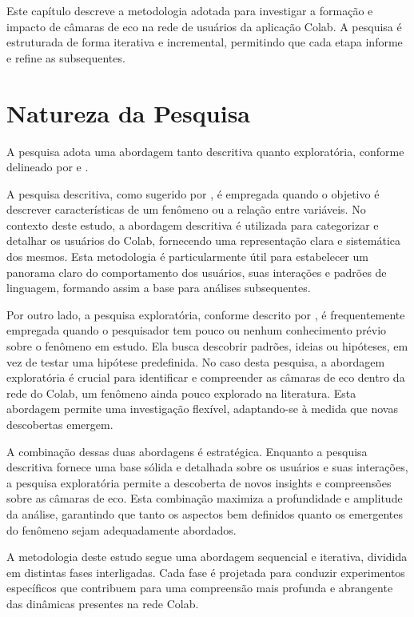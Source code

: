Este capítulo descreve a metodologia adotada para investigar a formação e impacto de câmaras de eco na rede de usuários da aplicação Colab. A pesquisa é estruturada de forma iterativa e incremental, permitindo que cada etapa informe e refine as subsequentes.

\section{Natureza da Pesquisa}

A pesquisa adota uma abordagem tanto descritiva quanto exploratória, conforme delineado por \cite{2008_Yin_BOOK} e \cite{2007_Babbie_BOOK}.

A pesquisa descritiva, como sugerido por \cite{2007_Babbie_BOOK}, é empregada quando o objetivo é descrever características de um fenômeno ou a relação entre variáveis. No contexto deste estudo, a abordagem descritiva é utilizada para categorizar e detalhar os usuários do Colab, fornecendo uma representação clara e sistemática dos mesmos. Esta metodologia é particularmente útil para estabelecer um panorama claro do comportamento dos usuários, suas interações e padrões de linguagem, formando assim a base para análises subsequentes.

Por outro lado, a pesquisa exploratória, conforme descrito por \cite{2008_Yin_BOOK}, é frequentemente empregada quando o pesquisador tem pouco ou nenhum conhecimento prévio sobre o fenômeno em estudo. Ela busca descobrir padrões, ideias ou hipóteses, em vez de testar uma hipótese predefinida. No caso desta pesquisa, a abordagem exploratória é crucial para identificar e compreender as câmaras de eco dentro da rede do Colab, um fenômeno ainda pouco explorado na literatura. Esta abordagem permite uma investigação flexível, adaptando-se à medida que novas descobertas emergem.

A combinação dessas duas abordagens é estratégica. Enquanto a pesquisa descritiva fornece uma base sólida e detalhada sobre os usuários e suas interações, a pesquisa exploratória permite a descoberta de novos insights e compreensões sobre as câmaras de eco. Esta combinação maximiza a profundidade e amplitude da análise, garantindo que tanto os aspectos bem definidos quanto os emergentes do fenômeno sejam adequadamente abordados.

A metodologia deste estudo segue uma abordagem sequencial e iterativa, dividida em distintas fases interligadas. Cada fase é projetada para conduzir experimentos específicos que contribuem para uma compreensão mais profunda e abrangente das dinâmicas presentes na rede Colab.

